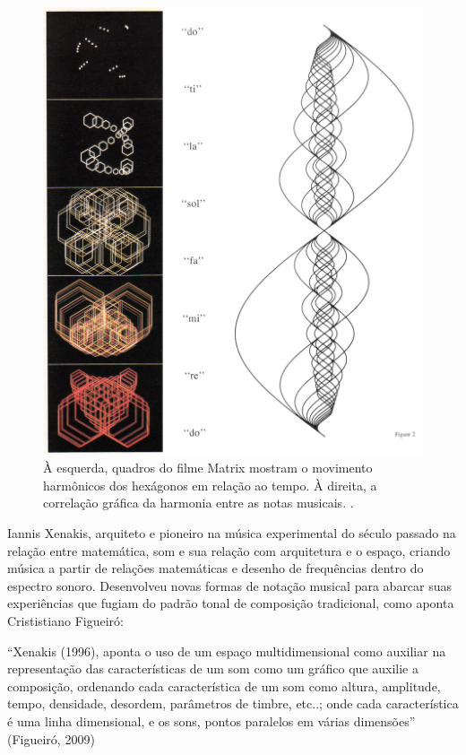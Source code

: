 \begin{figure}[ht]
    \caption{\label{witney}À esquerda, quadros do filme Matrix mostram o movimento harmônicos dos hexágonos em relação ao tempo. À direita, a correlação gráfica da harmonia entre as notas musicais.
.}
    \begin{center}
        \includegraphics[width=1\linewidth]{pictures/cap2/witney2}
    \end{center}
\end{figure}


Iannis Xenakis, arquiteto e pioneiro na música experimental do século passado na relação entre matemática, som e sua relação com arquitetura e o espaço, criando música a partir de relações matemáticas e desenho de frequências dentro do espectro sonoro. Desenvolveu novas formas de notação musical para abarcar suas experiências que fugiam do padrão tonal de composição tradicional, como aponta Crististiano Figueiró:

\begin{citacao}
``Xenakis (1996), aponta o uso de um espaço multidimensional como auxiliar na representação das características de um som como um gráfico que auxilie a composição, ordenando cada característica de um som como altura, amplitude, tempo, densidade, desordem, parâmetros de timbre, etc..; onde cada característica é uma linha dimensional, e os sons, pontos paralelos em várias dimensões'' (Figueiró, 2009)
\end{citacao}


